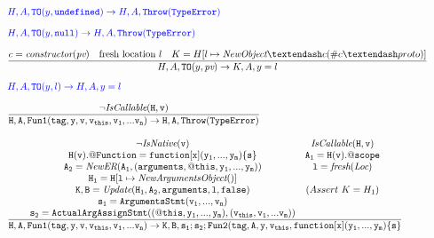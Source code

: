 \documentclass[a4paper, leqno]{amsart}
\def\inblue{\color{blue}}
\newcommand{\nullK}{{\tt null}}
\newcommand{\undef}{{\tt undefined}}
\newcommand{\te}{{\tt TypeError}}
\newcommand{\pv}{\emph{pv}}
\newcommand{\loc}{\emph{Loc}}
\begin{document}
\[
\begin{array}{l@{}l@{}ll}
 & \ \ &\inblue H,A,{\tt TO}(y,\undef) \rightarrow H,A,{\tt Throw}(\te)& \\[1em]

 & \ \ &\inblue H,A,{\tt TO}(y,\nullK) \rightarrow H,A,{\tt Throw}(\te)& \\[1em]

 & \ \ & \frac{
    \begin{matrix}
      c = \emph{constructor}(\pv) &
      \mbox{fresh location }l &
      K = H[l \mapsto \emph{NewObject}\textendash c(\#c\textendash proto)]
    \end{matrix}}{
    \begin{matrix}
       H,A,{\tt TO}(y,\pv) \rightarrow K,A,y=l
    \end{matrix}} & \\[1.5em]

 & \ \ &\inblue H,A,{\tt TO}(y,l) \rightarrow H,A,y=l& \\[1em]

 & \ \ & \frac{
    \begin{matrix}
       {\tt \neg \emph{IsCallable}(H,v)}
    \end{matrix}}{
    \begin{matrix}
       {\tt H,A,Fun1(tag,y,v,v_{this},v_1,...v_n) \rightarrow H,A,Throw(TypeError)}
    \end{matrix}} & \\ 
 & & \\
 
 & \ \ & \frac{
    \begin{matrix}
       {\tt \neg \emph{IsNative}(v)} & {\tt \emph{IsCallable}(H,v)} \\
       {\tt H(v).@Function=function[x](y_1,...,y_m)\{s\}} & {\tt A_1 = H(v).@scope} \\
       {\tt A_2 = \emph{NewER}(A_1,(arguments,@this,y_1,...,y_m))} & {\tt l = \emph{fresh}(\loc)} \\
       {\tt H_1 = H[l\mapsto \emph{NewArgumentsObject}()]} & \\
       {\tt K,B = \emph{Update}(H_1,A_2,arguments,l,false) } & (Assert \ K= H_1)\\
       {\tt s_1 = ArgumentsStmt(v_1, ...,v_n)} & \\
       {\tt s_2 = ActualArgAssignStmt((@this,y_1,...,y_m),(v_{this},v_1,...v_m))} \\
    \end{matrix}}{
    \begin{matrix}
       {\tt H,A,Fun1(tag,y,v,v_{this},v_1,...v_n) \rightarrow K,B,s_1;s_2;Fun2(tag,A,y,v_{this},function[x](y_1,...,y_m)\{s\}}
    \end{matrix}} & \\ 


\end{array}\]
\end{document}
